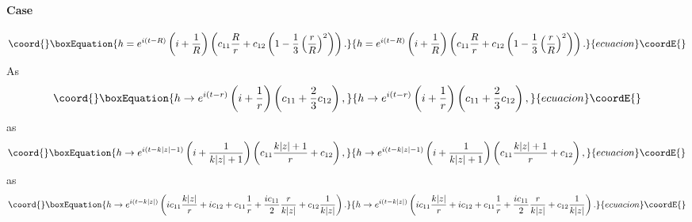 \documentclass[letterpaper,12pt]{article}
\begin{document}
\paragraph{Case \coordHE{}}
\begin{equation}\coord{}\boxEquation{
\label{} h=e^{i(t-R)}\left(i+\frac{1}{R}\right)
\left(c_{11}\frac{R}{r}+
c_{12}\left(1-\frac{1}{3}\left(\frac{r}{R}\right)^2\right)\right).
}{
h=e^{i(t-R)}\left(i+\frac{1}{R}\right)
\left(c_{11}\frac{R}{r}+
c_{12}\left(1-\frac{1}{3}\left(\frac{r}{R}\right)^2\right)\right).
}{ecuacion}\coordE{}\end{equation}
As \coordHE{}
\begin{equation}\coord{}\boxEquation{
\label{}
 h\to e^{i(t-r)}\left(i+\frac{1}{r}\right)\left(c_{11}+\frac{2}{3}c_{12}\right),
}{
h\to e^{i(t-r)}\left(i+\frac{1}{r}\right)\left(c_{11}+\frac{2}{3}c_{12}\right),
}{ecuacion}\coordE{}\end{equation}
as \coordHE{}
\begin{equation}\coord{}\boxEquation{
\label{}
 h\to e^{i(t-k|z|-1)}\left(i+\frac{1}{k|z|+1}\right)\left(c_{11}\frac{k|z|+1}{r}+c_{12}\right),
}{
h\to e^{i(t-k|z|-1)}\left(i+\frac{1}{k|z|+1}\right)\left(c_{11}\frac{k|z|+1}{r}+c_{12}\right),
}{ecuacion}\coordE{}\end{equation}
as \coordHE{}
\begin{equation}\coord{}\boxEquation{
\label{}
 h\to e^{i(t-k|z|)}\left(ic_{11}\frac{k|z|}{r} + ic_{12} + c_{11}\frac{1}{r}+
 \frac{ic_{11}}{2}\frac{r}{k|z|}+c_{12}\frac{1}{k|z|}\right).
}{
h\to e^{i(t-k|z|)}\left(ic_{11}\frac{k|z|}{r} + ic_{12} + c_{11}\frac{1}{r}+
 \frac{ic_{11}}{2}\frac{r}{k|z|}+c_{12}\frac{1}{k|z|}\right).
}{ecuacion}\coordE{}\end{equation}
\end{document}
